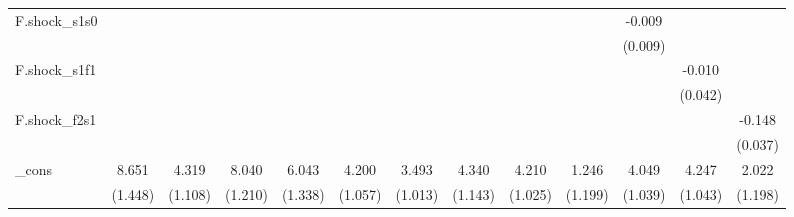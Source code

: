 {\begin{tabular}{l*{12}{c}}
\addlinespace
F.shock\_s1s0&                     &                     &                     &                     &                     &                     &                     &                     &                     &      -0.009         &                     &                     \\
            &                     &                     &                     &                     &                     &                     &                     &                     &                     &     (0.009)         &                     &                     \\
\addlinespace
F.shock\_s1f1&                     &                     &                     &                     &                     &                     &                     &                     &                     &                     &      -0.010         &                     \\
            &                     &                     &                     &                     &                     &                     &                     &                     &                     &                     &     (0.042)         &                     \\
\addlinespace
F.shock\_f2s1&                     &                     &                     &                     &                     &                     &                     &                     &                     &                     &                     &      -0.148\sym{***}\\
            &                     &                     &                     &                     &                     &                     &                     &                     &                     &                     &                     &     (0.037)         \\
\addlinespace
\_cons      &       8.651\sym{***}&       4.319\sym{***}&       8.040\sym{***}&       6.043\sym{***}&       4.200\sym{***}&       3.493\sym{***}&       4.340\sym{***}&       4.210\sym{***}&       1.246         &       4.049\sym{***}&       4.247\sym{***}&       2.022         \\
            &     (1.448)         &     (1.108)         &     (1.210)         &     (1.338)         &     (1.057)         &     (1.013)         &     (1.143)         &     (1.025)         &     (1.199)         &     (1.039)         &     (1.043)         &     (1.198)         \\

\end{tabular}}
